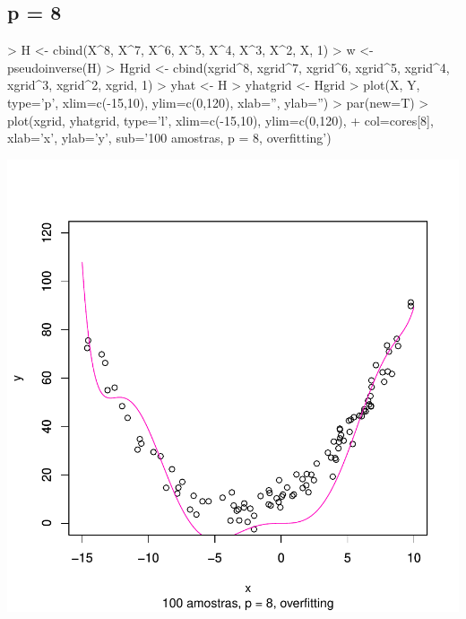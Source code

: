 \documentclass{article}
\begin{document}
\subsection{p = 8}
\begin{Schunk}
\begin{Sinput}
> H <- cbind(X^8, X^7, X^6, X^5, X^4, X^3, X^2, X, 1)
> w <- pseudoinverse(H) %
> Hgrid <- cbind(xgrid^8, xgrid^7, xgrid^6, xgrid^5, xgrid^4, xgrid^3, xgrid^2, xgrid, 1)
> yhat <- H %
> yhatgrid <- Hgrid %
> plot(X, Y, type='p', xlim=c(-15,10), ylim=c(0,120), xlab='', ylab='')
> par(new=T)
> plot(xgrid, yhatgrid, type='l', xlim=c(-15,10), ylim=c(0,120),
+      col=cores[8], xlab='x', ylab='y', sub='100 amostras, p = 8, overfitting')
\end{Sinput}
\end{Schunk}
\includegraphics{aprox-018}
\end{document}
